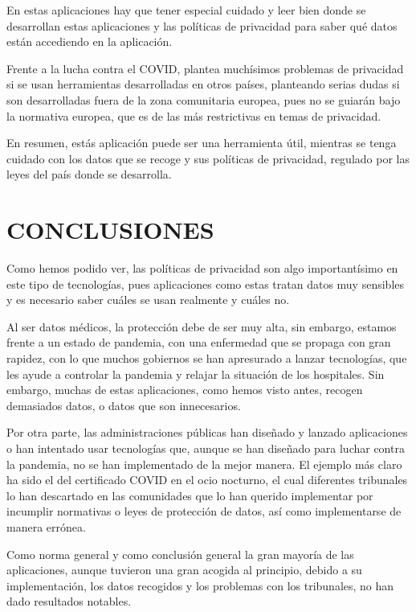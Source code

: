 \documentclass[11pt,a4paper,spanish]{article}
\begin{document}
En estas aplicaciones hay que tener especial cuidado y leer bien donde se desarrollan estas aplicaciones y las políticas de privacidad para saber qué datos están accediendo en la aplicación.

Frente a la lucha contra el COVID, plantea muchísimos problemas de privacidad si se usan herramientas desarrolladas en otros países, planteando serias dudas si son desarrolladas fuera de la zona comunitaria europea, pues no se guiarán bajo la normativa europea, que es de las más restrictivas en temas de privacidad.

En resumen, estás aplicación puede ser una herramienta útil, mientras se tenga cuidado con los datos que se recoge y sus políticas de privacidad, regulado por las leyes del país donde se desarrolla.

\section{CONCLUSIONES}

Como hemos podido ver, las políticas de privacidad son algo importantísimo en este tipo de tecnologías, pues aplicaciones como estas tratan datos muy sensibles y es necesario saber cuáles se usan realmente y cuáles no. 

Al ser datos médicos, la protección debe de ser muy alta, sin embargo, estamos frente a un estado de pandemia, con una enfermedad que se propaga con gran rapidez, con lo que muchos gobiernos se han apresurado a lanzar tecnologías, que les ayude a controlar la pandemia y relajar la situación de los hospitales. Sin embargo, muchas de estas aplicaciones, como hemos visto antes, recogen demasiados datos, o datos que son innecesarios. 

Por otra parte, las administraciones públicas han diseñado y lanzado aplicaciones o han intentado usar tecnologías que, aunque se han diseñado para luchar contra la pandemia, no se han implementado de la mejor manera. El ejemplo más claro ha sido el del certificado COVID en el ocio nocturno, el cual diferentes tribunales lo han descartado en las comunidades que lo han querido implementar por incumplir normativas o leyes de protección de datos, así como implementarse de manera errónea.

Como norma general y como conclusión general la gran mayoría de las aplicaciones, aunque tuvieron una gran acogida al principio, debido a su implementación, los datos recogidos y los problemas con los tribunales, no han dado resultados notables.
\end{document}

